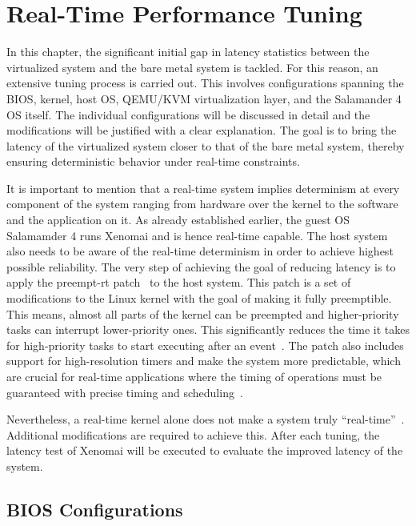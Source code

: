 \documentclass[MMR,Master,english]{twbook}
\begin{document}
\clearpage

\chapter{Real-Time Performance Tuning}\label{cha:real-time_tuning}

In this chapter, the significant initial gap in latency statistics between the virtualized system and the bare metal system is tackled. For this reason, an extensive tuning process is carried out. This involves configurations spanning the BIOS, kernel, host OS, QEMU/KVM virtualization layer, and the Salamander 4 OS itself. The individual configurations will be discussed in detail and the modifications will be justified with a clear explanation. The goal is to bring the latency of the virtualized system closer to that of the bare metal system, thereby ensuring deterministic behavior under real-time constraints.

\bigskip \noindent It is important to mention that a real-time system implies determinism at every component of the system ranging from hardware over the kernel to the software and the application on it. As already established earlier, the guest OS Salamamder 4 runs Xenomai and is hence real-time capable. The host system also needs to be aware of the real-time determinism in order to achieve highest possible reliability. The very step of achieving the goal of reducing latency is to apply the preempt-rt patch~\cite{RealtimePreempt_rt_versionsWiki} to the host system. This patch is a set of modifications to the Linux kernel with the goal of making it fully preemptible. This means, almost all parts of the kernel can be preempted and higher-priority tasks can interrupt lower-priority ones. This significantly reduces the time it takes for high-priority tasks to start executing after an event~\cite{RealtimeKernelPatchset}. The patch also includes support for high-resolution timers and make the system more predictable, which are crucial for real-time applications where the timing of operations must be guaranteed with precise timing and scheduling~\cite{rostedtInternalsRTPatch}. 

\bigskip \noindent Nevertheless, a real-time kernel alone does not make a system truly “real-time”~\cite{WhatRealtimeLinux}. Additional modifications are required to achieve this. After each tuning, the latency test of Xenomai will be executed to evaluate the improved latency of the system.

\section{BIOS Configurations}\label{sec:bios_configurations}
\end{document}
